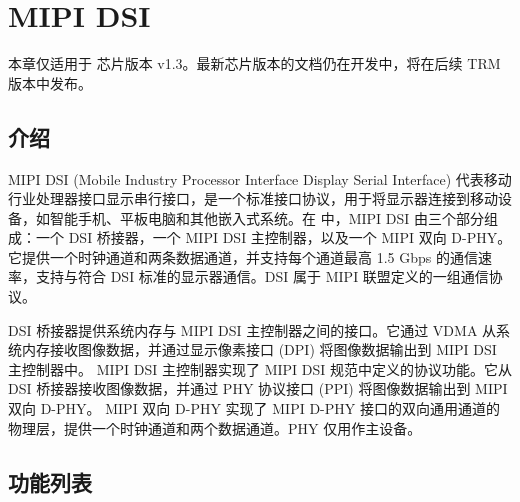 \documentclass[main\_\_CN.tex]{subfiles}
\begin{document}

\ifglobal
\else
    {\let\clearpage\relax \listoftodos}
    {\let\clearpage\relax \listofdonetodos}
    \tableofcontents
\fi



\hypertarget{mipidsi}{}
\chapter{MIPI DSI}
\label{mod:mipidsi}

\begin{tiplisting}
本章仅适用于 \chipname{} 芯片版本 v1.3。最新芯片版本的文档仍在开发中，将在后续 TRM 版本中发布。
\end{tiplisting}

\section{介绍}
MIPI DSI (Mobile Industry Processor Interface Display Serial Interface) 代表移动行业处理器接口显示串行接口，是一个标准接口协议，用于将显示器连接到移动设备，如智能手机、平板电脑和其他嵌入式系统。在 \chipseries{} 中，MIPI DSI 由三个部分组成：一个 DSI 桥接器，一个 MIPI DSI 主控制器，以及一个 MIPI 双向 D-PHY。它提供一个时钟通道和两条数据通道，并支持每个通道最高 1.5 Gbps 的通信速率，支持与符合 DSI 标准的显示器通信。DSI 属于 MIPI 联盟定义的一组通信协议。

DSI 桥接器提供系统内存与 MIPI DSI 主控制器之间的接口。它通过 VDMA 从系统内存接收图像数据，并通过显示像素接口 (DPI) 将图像数据输出到 MIPI DSI 主控制器中。
MIPI DSI 主控制器实现了 MIPI DSI 规范中定义的协议功能。它从 DSI 桥接器接收图像数据，并通过 PHY 协议接口 (PPI) 将图像数据输出到 MIPI 双向 D-PHY。
MIPI 双向 D-PHY 实现了 MIPI D-PHY 接口的双向通用通道的物理层，提供一个时钟通道和两个数据通道。PHY 仅用作主设备。





\section{功能列表}
\label{sec:mipidsi-features}
\end{document}
